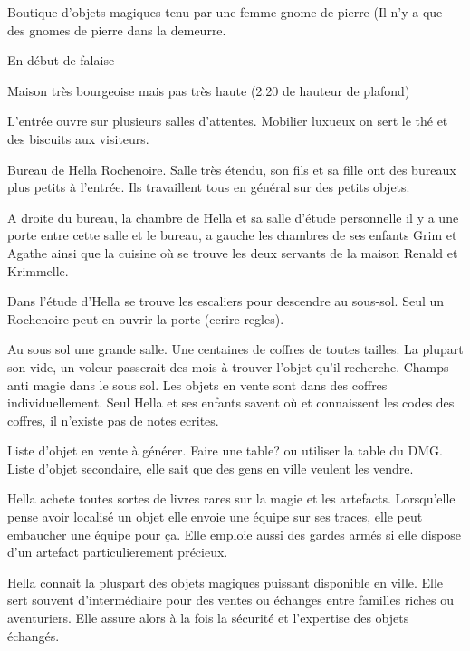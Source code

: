 Boutique d'objets magiques tenu par une femme gnome de pierre
(Il n'y a que des gnomes de pierre dans la demeurre.

En début de falaise

Maison très bourgeoise mais pas très haute (2.20 de hauteur de plafond)

L'entrée ouvre sur plusieurs salles d'attentes. Mobilier luxueux on sert 
le thé et des biscuits aux visiteurs.

Bureau de Hella Rochenoire. Salle très étendu, son fils et sa fille ont
des bureaux plus petits à l'entrée. Ils travaillent tous en général sur 
des petits objets. 

A droite du bureau, la chambre de Hella et sa salle d'étude personnelle
il y a une porte entre cette salle et le bureau, a gauche les chambres
de ses enfants Grim et Agathe ainsi que la cuisine où se trouve les deux
servants de la maison Renald et Krimmelle.

Dans l'étude d'Hella se trouve les escaliers pour descendre au sous-sol.
Seul un Rochenoire peut en ouvrir la porte (ecrire regles).

Au sous sol une grande salle. Une centaines de coffres de toutes tailles.
La plupart son vide, un voleur passerait des mois à trouver l'objet 
qu'il recherche. Champs anti magie dans le sous sol. Les objets en vente 
sont dans des coffres individuellement. Seul Hella et ses enfants savent 
où et connaissent les codes des coffres, il n'existe pas de notes ecrites.

Liste d'objet en vente à générer. Faire une table? ou utiliser la table
du DMG. Liste d'objet secondaire, elle sait que des gens en ville veulent 
les vendre.

Hella achete toutes sortes de livres rares sur la magie et les artefacts.
Lorsqu'elle pense avoir localisé un objet elle envoie une équipe sur ses 
traces, elle peut embaucher une équipe pour ça. Elle emploie aussi des
gardes armés si elle dispose d'un artefact particulierement précieux.

Hella connait la pluspart des objets magiques puissant disponible en ville.
Elle sert souvent d'intermédiaire pour des ventes ou échanges entre familles
riches ou aventuriers. Elle assure alors à la fois la sécurité et 
l'expertise des objets échangés. 

